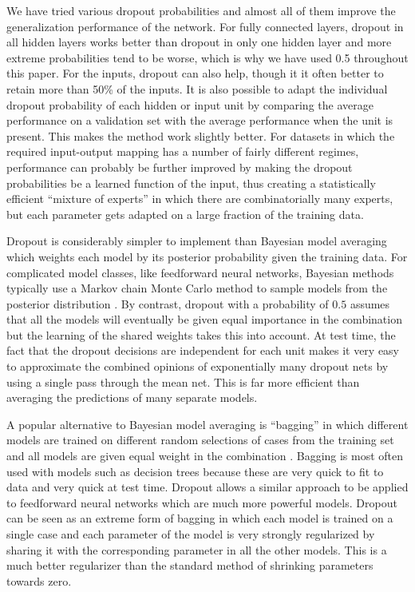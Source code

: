 \documentclass[12pt]{article}
\begin{document}
We have tried various dropout probabilities and almost all of them improve the
generalization performance of the network.  For fully connected layers, dropout in all
hidden layers works better than dropout in only one hidden layer and more extreme
probabilities tend to be worse, which is why we have used 0.5 throughout this paper.  For
the inputs, dropout can also help, though it it often better to retain more than 50\% of
the inputs. It is also possible to adapt the individual dropout probability of each hidden
or input unit by comparing the average performance on a validation set with the average
performance when the unit is present. This makes the method work slightly
better. For datasets in which the required input-output mapping has a
number of fairly different regimes, performance can probably be further improved by making
the dropout probabilities be a learned function of the input, thus creating a
statistically efficient ``mixture of experts'' \cite{Jacobs} in which there are
combinatorially many experts, but each parameter gets adapted on a large fraction of the
training data.

Dropout is considerably simpler to implement than Bayesian model averaging which weights
each model by its posterior probability given the training data. For complicated model
classes, like feedforward neural networks, Bayesian methods typically use a Markov chain
Monte Carlo method to sample models from the posterior distribution \cite{NealThesis}.  By
contrast, dropout with a probability of $0.5$ assumes that all the models will eventually
be given equal importance in the combination but the learning of the shared weights takes
this into account. At test time, the fact that the dropout decisions are independent for
each unit makes it very easy to approximate the combined opinions of exponentially many
dropout nets by using a single pass through the mean net. This is far more efficient than
averaging the predictions of many separate models.

A popular alternative to Bayesian model averaging is ``bagging'' in which different models
are trained on different random selections of cases from the training set and all models
are given equal weight in the combination \cite{Breiman}. Bagging is most often used with
models such as decision trees because these are very quick to fit to data and very quick
at test time\cite{RandomForests}. Dropout allows a similar approach to be applied to feedforward
neural networks which are much more powerful models.  Dropout can be seen as an extreme
form of bagging in which each model is trained on a single case and each parameter of the
model is very strongly regularized by sharing it with the corresponding parameter in all
the other models. This is a much better regularizer than the standard method of shrinking
parameters towards zero.
\end{document}
